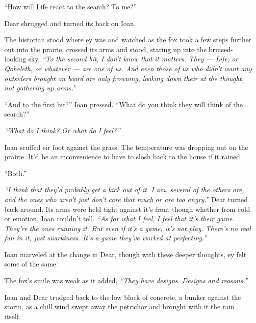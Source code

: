 ``How will Life react to the search? To me?''

Dear shrugged and turned its back on Ioan.

The historian stood where ey was and watched as the fox took a few steps further out into the prairie, crossed its arms and stood, staring up into the bruised-looking sky. \emph{``To the second bit, I don't know that it matters. They --- Life, or Qoheleth, or whatever --- are one of us. And even those of us who didn't want any outsiders brought on board are only frowning, looking down their at the thought, not gathering up arms.''}

``And to the first bit?'' Ioan pressed. ``What do you think they will think of the search?''

\emph{``What do I think? Or what do I feel?''}

Ioan scuffed eir foot against the grass. The temperature was dropping out on the prairie. It'd be an inconvenience to have to slosh back to the house if it rained.

``Both.''

\emph{``I think that they'd probably get a kick out of it. I am, several of the others are, and the ones who aren't just don't care that much or are too angry.''} Dear turned back around. Its arms were held tight against it's front though whether from cold or emotion, Ioan couldn't tell. \emph{``As for what I feel, I feel that it's their game. They're the ones running it. But even if it's a game, it's not play. There's no real fun in it, just snarkiness. It's a game they've worked at perfecting.''}

Ioan marveled at the change in Dear, though with these deeper thoughts, ey felt some of the same.

The fox's smile was weak as it added, \emph{``They have designs. Designs and reasons.''}

Ioan and Dear trudged back to the low block of concrete, a bunker against the storm, as a chill wind swept away the petrichor and brought with it the rain itself.
